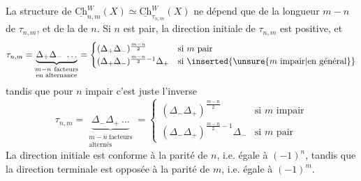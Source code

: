 La structure de $\underline{\mathrm{Ch}}^W_{n,m}(X)\simeq\underline{\mathrm{Ch}}^W_{\tau_{n,m}}(X)$
ne dépend que de la longueur $m-n$ de $\tau_{n,m}$,
et de la \uline{} de $n$. Si $n$ est pair,
la direction initiale de $\tau_{n,m}$ est positive,
et
\[
\tau_{n,m}=\underbrace{\Delta_+\Delta_-\ \ldots}_{\substack{m-n\ \text{facteurs}\\\text{en alternance}}}
=\begin{cases}
(\Delta_+\Delta_-)^{\frac{m-n}{2}}&\text{si }m\text{ pair}\\
(\Delta_+\Delta_-)^{\frac{m-n}{2}-1}\Delta_+&\text{si }\inserted{\unsure{m\text{ impair}|\text{en général}}}
\end{cases}
\]
tandis que pour $n$ impair c'est juste l'inverse
\[
\tau_{n,m}=\underbrace{\Delta_-\Delta_+\ \ldots}_{\substack{m-n\ \text{facteurs}\\\text{alternés}}}
=\begin{cases}
(\Delta_-\Delta_+)^{\frac{m-n}{2}}&\text{si }m\text{ impair}\\
(\Delta_-\Delta_+)^{\frac{m-n}{2}-1}\Delta_-&\text{si }m\text{ pair}
\end{cases}
\]
La direction initiale est conforme à la parité
de $n$, i.e. égale à $(-1)^n$, tandis que la direction
 terminale est opposée à la parité de $m$, i.e. égale
à $(-1)^m$.

